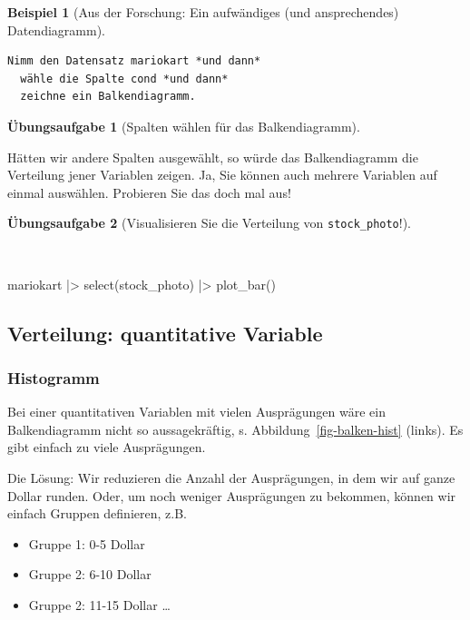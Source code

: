 \documentclass[
  a4paper,
]{scrbook}
\newenvironment{Shaded}{\begin{snugshade}}{\end{snugshade}}
\newcommand{\FunctionTok}[1]{\textcolor[rgb]{0.28,0.35,0.67}{#1}}
\newcommand{\NormalTok}[1]{\textcolor[rgb]{0.00,0.23,0.31}{#1}}
\newcommand{\SpecialCharTok}[1]{\textcolor[rgb]{0.37,0.37,0.37}{#1}}
\providecommand{\tightlist}{%
  \setlength{\itemsep}{0pt}\setlength{\parskip}{0pt}}\usepackage{longtable,booktabs,array}
\theoremstyle{definition}
\newtheorem{example}{Beispiel}[chapter]
\theoremstyle{definition}
\theoremstyle{definition}
\newtheorem{exercise}{Übungsaufgabe}[chapter]
\theoremstyle{remark}
\begin{document}
\begin{example}[Aus der Forschung: Ein aufwändiges (und ansprechendes)
Datendiagramm]
\begin{verbatim}
Nimm den Datensatz mariokart *und dann*
  wähle die Spalte cond *und dann*
  zeichne ein Balkendiagramm.
\end{verbatim}

\begin{exercise}[Spalten wählen für das
Balkendiagramm]\protect\hypertarget{exr-de1}{}\label{exr-de1}

Hätten wir andere Spalten ausgewählt, so würde das Balkendiagramm die
Verteilung jener Variablen zeigen. Ja, Sie können auch mehrere Variablen
auf einmal auswählen. Probieren Sie das doch mal aus!

\end{exercise}

\begin{exercise}[Visualisieren Sie die Verteilung von
\texttt{stock\_photo}!]\protect\hypertarget{exr-balken}{}\label{exr-balken}

~

\begin{Shaded}
\begin{Highlighting}[]
\NormalTok{mariokart }\SpecialCharTok{|\textgreater{}} 
  \FunctionTok{select}\NormalTok{(stock\_photo) }\SpecialCharTok{|\textgreater{}} 
  \FunctionTok{plot\_bar}\NormalTok{()}
\end{Highlighting}
\end{Shaded}

\end{exercise}

\subsection{Verteilung: quantitative
Variable}\label{verteilung-quantitative-variable}

\subsubsection{Histogramm}\label{histogramm}

Bei einer quantitativen Variablen mit vielen Ausprägungen wäre ein
Balkendiagramm nicht so aussagekräftig, s.
Abbildung~\ref{fig-balken-hist} (links). Es gibt einfach zu viele
Ausprägungen.

Die Lösung: Wir reduzieren die Anzahl der Ausprägungen, in dem wir auf
ganze Dollar runden. Oder, um noch weniger Ausprägungen zu bekommen,
können wir einfach Gruppen definieren, z.B.

\begin{itemize}
\tightlist
\item
  Gruppe 1: 0-5 Dollar
\item
  Gruppe 2: 6-10 Dollar
\item
  Gruppe 2: 11-15 Dollar \ldots{}
\end{itemize}


\end{example}
\end{document}
